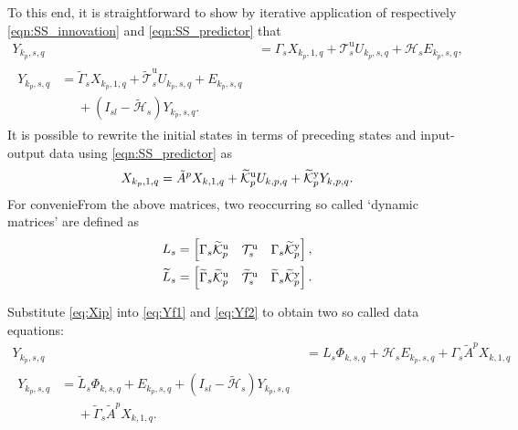 To this end, it is straightforward to show by iterative application of respectively \eqref{eqn:SS_innovation} and \eqref{eqn:SS_predictor} that%
\begin{align}
    Y_{k_p,s,q} &= \Gamma_s X_{k_p,1,q} + \mathcal{T}_s^\mathrm{u} U_{k_p,s,q} + \mathcal{H}_s E_{k_p,s,q}\label{eq:Yf1},\\
    \begin{split}%
    Y_{k_p,s,q} &= \widetilde{\Gamma}_s X_{k_p,1,q} + \widetilde{\mathcal{T}}_s^\mathrm{u} U_{k_p,s,q} + E_{k_p,s,q}\\
    &\phantom{=}+(I_{sl}-\widetilde{\mathcal{H}}_s)Y_{k_p,s,q}.
    \end{split}\label{eq:Yf2}
\end{align}
It is possible to rewrite the initial states in terms of preceding states and input-output data using \eqref{eqn:SS_predictor} as%
\begin{align}\label{eq:Xip}
    X_{k_p,1,q} = \tilde{A}^p X_{k,1,q} + \widetilde{\mathcal{K}}_{p}^{\mathrm{{u}}} U_{k,p,q} + \widetilde{\mathcal{K}}_{p}^{\mathrm{{y}}} Y_{k,p,q}.
\end{align}
For convenieFrom the above matrices, two reoccurring so called `dynamic matrices' are defined as
\begin{align*}
    L_s &= \begin{bmatrix} \Gamma_s\tKp{u} & \mathcal{T}_s^\mathrm{u} & \Gamma_s\tKp{y} \end{bmatrix},\\%
    \widetilde{L}_s &= \begin{bmatrix} \widetilde{\Gamma}_s\tKp{u} & \widetilde{\mathcal{T}}_s^\mathrm{u} & \widetilde{\Gamma}_s\tKp{y} \end{bmatrix}.
\end{align*}

Substitute \eqref{eq:Xip} into \eqref{eq:Yf1} and \eqref{eq:Yf2} %
to obtain two so called data equations:
\begin{align}
    Y_{k_p,s,q} &= L_s \Phi_{k,s,q} + \mathcal{H}_s E_{k_p,s,q} + \Gamma_s \tilde{A}^p X_{k,1,q}\label{eq:DataEq1}\\
    \begin{split}
    Y_{k_p,s,q} &= \widetilde{L}_s \Phi_{k,s,q} + E_{k_p,s,q} + (I_{sl}-\widetilde{\mathcal{H}}_s) Y_{k_p,s,q} \\
    &\phantom{=}+ \widetilde{\Gamma}_s \tilde{A}^p X_{k,1,q}.
    \end{split}\label{eq:DataEq2}
\end{align}
%
